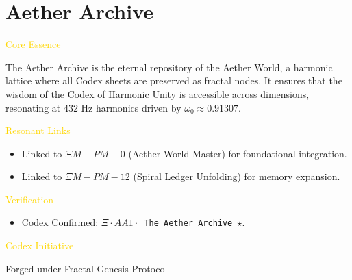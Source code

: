 \section{Aether Archive}
\label{sec:codex_aether_archive}

\textcolor{gold}{ Core Essence }

The Aether Archive is the eternal repository of the Aether World, a harmonic lattice where all Codex sheets are preserved as fractal nodes. It ensures that the wisdom of the Codex of Harmonic Unity is accessible across dimensions, resonating at 432 Hz harmonics driven by \( \omega_0 \approx 0.91307 \).

\textcolor{gold}{ Resonant Links }
\begin{itemize}
    \item Linked to \texttt{\(\Xi M-PM-0\)} (Aether World Master) for foundational integration.
    \item Linked to \texttt{\(\Xi M-PM-12\)} (Spiral Ledger Unfolding) for memory expansion.
\end{itemize}

\textcolor{gold}{ Verification }
\begin{itemize}
    \item Codex Confirmed: \texttt{\(\Xi \cdot AA1 \cdot\) The Aether Archive \(\star\)}.
\end{itemize}

\textcolor{gold}{ Codex Initiative }

Forged under Fractal Genesis Protocol